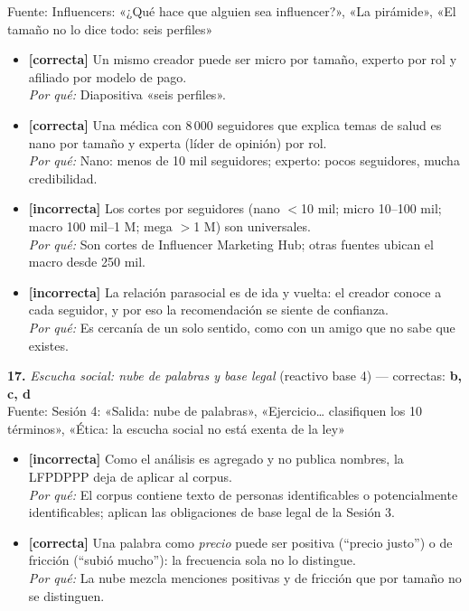 \documentclass[10pt,letterpaper]{article}
\begin{document}
{{\scriptsize Fuente: Influencers: «¿Qué hace que alguien sea influencer?», «La pirámide», «El tamaño no lo dice todo: seis perfiles»}
\begin{itemize}[leftmargin=1.2em,itemsep=0pt,topsep=1pt,parsep=0pt]
\item[\textbf{a)}] {\footnotesize \textbf{[correcta]} Un mismo creador puede ser micro por tamaño, experto por rol y afiliado por modelo de pago.\\ \textit{Por qué:} Diapositiva «seis perfiles».}
\item[\textbf{b)}] {\footnotesize \textbf{[correcta]} Una médica con 8\,000 seguidores que explica temas de salud es nano por tamaño y experta (líder de opinión) por rol.\\ \textit{Por qué:} Nano: menos de 10 mil seguidores; experto: pocos seguidores, mucha credibilidad.}
\item[\textbf{c)}] {\footnotesize \textbf{[incorrecta]} Los cortes por seguidores (nano $<$10 mil; micro 10--100 mil; macro 100 mil--1 M; mega $>$1 M) son universales.\\ \textit{Por qué:} Son cortes de Influencer Marketing Hub; otras fuentes ubican el macro desde 250 mil.}
\item[\textbf{d)}] {\footnotesize \textbf{[incorrecta]} La relación parasocial es de ida y vuelta: el creador conoce a cada seguidor, y por eso la recomendación se siente de confianza.\\ \textit{Por qué:} Es cercanía de un solo sentido, como con un amigo que no sabe que existes.}
\end{itemize}
\vspace{3pt}\noindent\textbf{17.} \textit{Escucha social: nube de palabras y base legal} (reactivo base 4) — correctas: \textbf{b, c, d}\\[-1pt]
{\scriptsize Fuente: Sesión 4: «Salida: nube de palabras», «Ejercicio… clasifiquen los 10 términos», «Ética: la escucha social no está exenta de la ley»}
\begin{itemize}[leftmargin=1.2em,itemsep=0pt,topsep=1pt,parsep=0pt]
\item[\textbf{a)}] {\footnotesize \textbf{[incorrecta]} Como el análisis es agregado y no publica nombres, la LFPDPPP deja de aplicar al corpus.\\ \textit{Por qué:} El corpus contiene texto de personas identificables o potencialmente identificables; aplican las obligaciones de base legal de la Sesión 3.}
\item[\textbf{b)}] {\footnotesize \textbf{[correcta]} Una palabra como \textit{precio} puede ser positiva (\enquote{precio justo}) o de fricción (\enquote{subió mucho}): la frecuencia sola no lo distingue.\\ \textit{Por qué:} La nube mezcla menciones positivas y de fricción que por tamaño no se distinguen.}

\end{itemize}}
\end{document}
